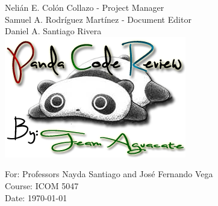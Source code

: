 \begin{titlepage}
\begin{center}
Nelián E. Colón Collazo - Project Manager \\
Samuel A. Rodríguez Martínez - Document Editor \\
Daniel A. Santiago Rivera \\[1.5cm]

\includegraphics[scale=1.25]{img/pandaLogoTeamAguacate}\\[1cm]

\vfill

For: Professors Nayda Santiago and José Fernando Vega \\
Course: ICOM 5047 \\
Date: \today






\end{center}

\end{titlepage}
